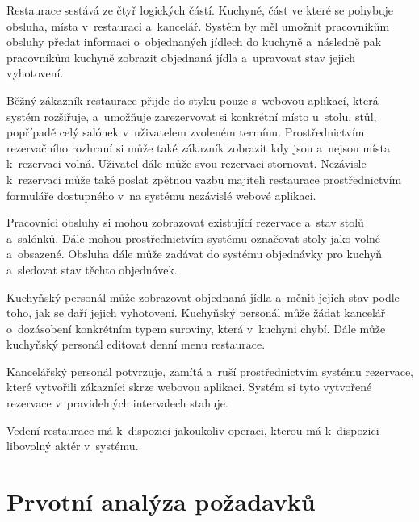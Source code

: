 \documentclass[a4paper,10pt]{article}
\begin{document}
Restaurace sestává ze čtyř logických částí. Kuchyně, část ve které se pohybuje obsluha, místa v~restauraci a~kancelář. Systém by měl umožnit pracovníkům obsluhy předat informaci o~objednaných jídlech do kuchyně a~následně pak pracovníkům kuchyně zobrazit objednaná jídla a~upravovat stav jejich vyhotovení.

Běžný zákazník restaurace přijde do styku pouze s~webovou aplikací, která systém rozšiřuje, a~umožňuje zarezervovat si konkrétní místo u~stolu, stůl, popřípadě celý salónek v~uživatelem zvoleném termínu. Prostřednictvím rezervačního rozhraní si může také zákazník zobrazit kdy jsou a~nejsou místa k~rezervaci volná. Uživatel dále může svou rezervaci stornovat. Nezávisle k~rezervaci může také poslat zpětnou vazbu majiteli restaurace prostřednictvím formuláře dostupného v~na systému nezávislé webové aplikaci.

Pracovníci obsluhy si mohou zobrazovat existující rezervace a~stav stolů a~salónků. Dále mohou prostřednictvím systému označovat stoly jako volné a~obsazené. Obsluha dále může zadávat do systému objednávky pro kuchyň a~sledovat stav těchto objednávek.

Kuchyňský personál může zobrazovat objednaná jídla a~měnit jejich stav podle toho, jak se daří jejich vyhotovení. Kuchyňský personál může žádat kancelář o~dozásobení konkrétním typem suroviny, která v~kuchyni chybí. Dále může kuchyňský personál editovat denní menu restaurace.

Kancelářský personál potvrzuje, zamítá a~ruší prostřednictvím systému rezervace, které vytvořili zákazníci skrze webovou aplikaci. Systém si tyto vytvořené rezervace v~pravidelných intervalech stahuje.

Vedení restaurace má k~dispozici jakoukoliv operaci, kterou má k~dispozici libovolný aktér v~systému.


\section*{Prvotní analýza požadavků}
\end{document}
